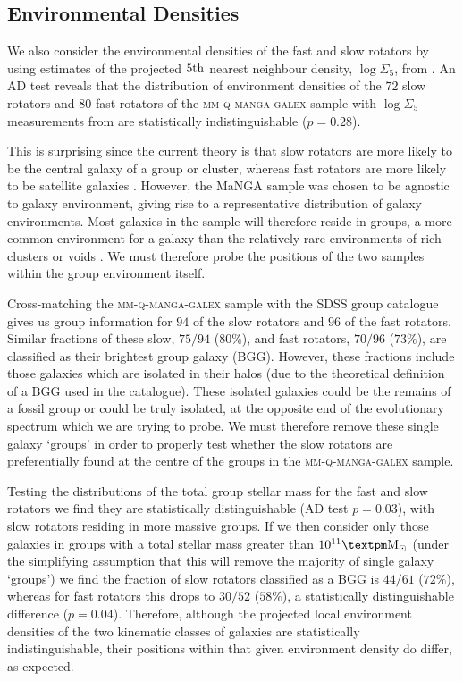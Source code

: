\documentclass[useAMS,usenatbib]{mn2e}
\def\minor		{\color{minorcol}}
\begin{document}
\subsection{Environmental Densities}\label{sec:env}

We also consider the environmental densities of the fast and slow rotators by using estimates of the projected $5\rm{th}$ nearest neighbour density,  $\log\Sigma_5$, from \cite{bamford09}. An AD test reveals that the distribution of environment densities of the $72$ slow rotators and $80$ fast rotators of the \textsc{mm-q-manga-galex} sample with $\log\Sigma_5$ measurements from \cite{bamford09} are statistically indistinguishable ($p=0.28$). 

This is surprising since the current theory is that slow rotators are more likely to be the central galaxy of a group or cluster, whereas fast rotators are more likely to be satellite galaxies \citep{cappellari11, deugenio13, houghton13, scott14}. {\minor However, the MaNGA sample was chosen to be agnostic to galaxy environment, giving rise to a representative distribution of galaxy environments. Most galaxies in the sample will therefore reside in groups, a more common environment for a galaxy than the relatively rare environments of rich clusters \citep{carlberg04} or voids \citep{rieder13}. We must therefore probe the positions of the two samples within the group environment itself.} 

Cross-matching the \textsc{mm-q-manga-galex} sample with the \cite{yang09} SDSS group catalogue gives us group information for $94$ of the slow rotators and $96$ of the fast rotators. Similar fractions of these slow, $75/94$ ($80\%$), and fast rotators, $70/96$ ($73\%$), are classified as their brightest group galaxy (BGG). However, these fractions include those galaxies which are isolated in their halos {\minor (due to the theoretical definition of a BGG used in the \citealt{yang09} catalogue). These isolated galaxies could be the remains of a fossil group \citep{ponman94, jones00, jones03} or could be truly isolated, at the opposite end of the evolutionary spectrum which we are trying to probe. We must therefore remove these single galaxy `groups' in order to properly test whether the slow rotators are preferentially found at the centre of the groups in the \textsc{mm-q-manga-galex} sample.} 

Testing the distributions of the total group stellar mass for the fast and slow rotators we find they are statistically distinguishable (AD test $p=0.03$), with slow rotators residing in more massive groups. If we then consider only those galaxies in groups with a total stellar mass greater than $10^{11}±\rm{M}_{\odot}$ (under the simplifying assumption that this will remove the majority of single galaxy `groups') we find the fraction of slow rotators classified as a BGG is $44/61$ ($72\%$), whereas for fast rotators this drops to $30/52$ ($58\%$), a statistically distinguishable difference ($p=0.04$). Therefore, although the projected local environment densities of the two kinematic classes of galaxies are statistically indistinguishable, their positions within that given environment density do differ, as expected. 
\end{document}
